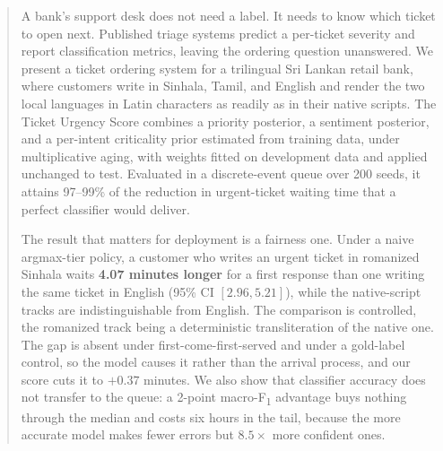 \begin{abstract}
A bank's support desk does not need a label. It needs to know which ticket to
open next. Published triage systems predict a per-ticket severity and report
classification metrics, leaving the ordering question unanswered. We present a
ticket ordering system for a trilingual Sri Lankan retail bank, where customers
write in Sinhala, Tamil, and English and render the two local languages in Latin
characters as readily as in their native scripts. The Ticket Urgency Score
combines a priority posterior, a sentiment posterior, and a per-intent
criticality prior estimated from training data, under multiplicative aging, with
weights fitted on development data and applied unchanged to test. Evaluated in a
discrete-event queue over 200 seeds, it attains 97--99\% of the reduction in
urgent-ticket waiting time that a perfect classifier would deliver.

The result that matters for deployment is a fairness one. Under a naive
argmax-tier policy, a customer who writes an urgent ticket in romanized Sinhala
waits \textbf{4.07 minutes longer} for a first response than one writing the
same ticket in English (95\% CI $[2.96, 5.21]$), while the native-script tracks
are indistinguishable from English. The comparison is controlled, the romanized
track being a deterministic transliteration of the native one. The gap is absent
under first-come-first-served and under a gold-label control, so the model causes
it rather than the arrival process, and our score cuts it to $+0.37$ minutes. We also show that classifier accuracy does not
transfer to the queue: a 2-point macro-F\textsubscript{1} advantage buys nothing
through the median and costs six hours in the tail, because the more accurate
model makes fewer errors but $8.5\times$ more confident ones.
\end{abstract}
